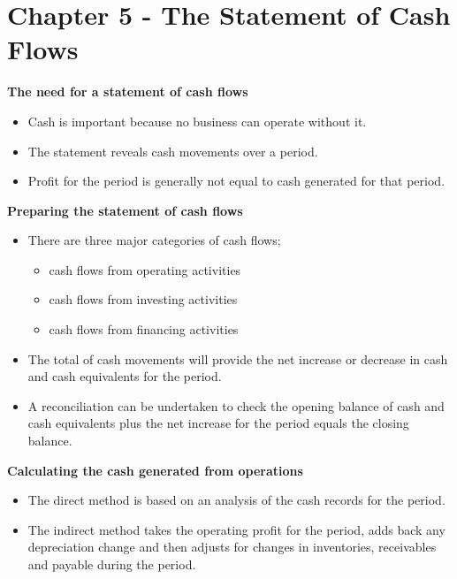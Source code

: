 \documentclass{report}
\begin{document}
\section{Chapter 5 - The Statement of Cash Flows}

\textbf{The need for a statement of cash flows}
\begin{itemize}
    \item Cash is important because no business can operate without it.
    \item The statement reveals cash movements over a period.
    \item Profit for the period is generally not equal to cash generated for that period.\\
\end{itemize}

\textbf{Preparing the statement of cash flows}
\begin{itemize}
    \item There are three major categories of cash flows;
    \begin{itemize}
        \item cash flows from operating activities
        \item cash flows from investing activities
        \item cash flows from financing activities
    \end{itemize}
    \item The total of cash movements will provide the net increase or decrease in cash and cash equivalents for the period.
    \item A reconciliation can be undertaken to check the opening balance of cash and cash equivalents plus the net increase for the period equals the closing balance.\\
\end{itemize}

\textbf{Calculating the cash generated from operations}
\begin{itemize}
    \item The direct method is based on an analysis of the cash records for the period.
    \item The indirect method takes the operating profit for the period, adds back any depreciation change and then adjusts for changes in inventories, receivables and payable during the period.\\
\end{itemize}
\end{document}
